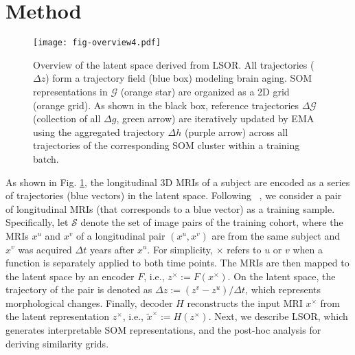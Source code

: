 \documentclass[runningheads]{llncs}
\begin{document}
\section{Method}

\begin{figure}[t]
\centering
\texttt{[image: fig-overview4.pdf]}
\caption{Overview of the latent space derived from LSOR. All trajectories ($\Delta z$) form a trajectory field (blue box) modeling brain aging. SOM representations in $\mathcal{G}$ (orange star) are organized as a 2D grid (orange grid). As shown in the black box, reference trajectories $\Delta \mathcal{G}$ (collection of all $\Delta g$, green arrow) are iteratively updated by EMA using the aggregated trajectory $\Delta h$ (purple arrow) across all trajectories of the corresponding SOM cluster within a training batch.
} 
\label{fig:overview}
\end{figure}

As shown in Fig. \ref{fig:overview}, the longitudinal 3D MRIs of a subject are encoded as a series of trajectories (blue vectors) in the latent space. Following ~\cite{ouyang2021self,zhao2020lssl}, we consider a pair of longitudinal MRIs (that corresponds to a blue vector) as a training sample. Specifically, let $\mathcal{S}$ denote the set of image pairs of the training cohort, where the MRIs $x^u$ and $x^v$ of a longitudinal pair $(x^u, x^v)$ are from the same subject and $x^v$ was acquired $\Delta t$ years after $x^u$. For simplicity, $\times$ refers to $u$ or $v$ when a function is separately applied to both time points. The MRIs are then mapped to the latent space by an encoder $F$, i.e., $z^\times:=F(x^\times)$. On the latent space, the trajectory of the pair is denoted as $\Delta z := (z^v - z^u) / \Delta t$, which represents morphological changes. Finally, decoder $H$ reconstructs the input MRI $x^\times$ from the latent representation $z^\times$, i.e., $\tilde{x}^\times:=H(z^\times)$. Next, we describe LSOR, which generates interpretable SOM representations, and the post-hoc analysis for deriving similarity grids.
\end{document}

